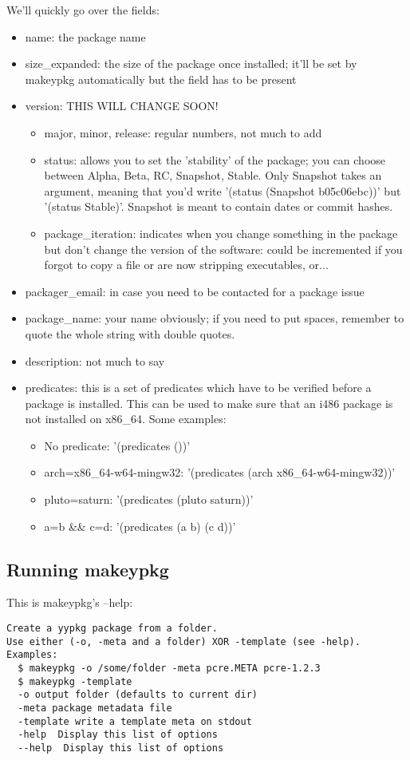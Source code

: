 \documentclass[a4paper]{article}
\begin{document}
We'll quickly go over the fields:
\begin{itemize}
  \item{name}: the package name
  \item{size\_expanded}: the size of the package once installed; it'll be set by makeypkg automatically but the field has to be present
  \item{version}: THIS WILL CHANGE SOON!
    \begin{itemize}
      \item{major, minor, release}: regular numbers, not much to add
      \item{status}: allows you to set the 'stability' of the package; you can choose between Alpha, Beta, RC, Snapshot, Stable. Only Snapshot takes an argument, meaning that you'd write '(status (Snapshot b05c06ebc))' but '(status Stable)'. Snapshot is meant to contain dates or commit hashes.
      \item{package\_iteration}: indicates when you change something in the package but don't change the version of the software: could be incremented if you forgot to copy a file or are now stripping executables, or...
    \end{itemize}
  \item{packager\_email}: in case you need to be contacted for a package issue
  \item{package\_name}: your name obviously; if you need to put spaces, remember to quote the whole string with double quotes.
  \item{description}: not much to say
  \item{predicates}: this is a set of predicates which have to be verified before a package is installed. This can be used to make sure that an i486 package is not installed on x86\_64. Some examples:
    \begin{itemize}
      \item{No predicate}: '(predicates ())'
      \item{arch=x86\_64-w64-mingw32}: '(predicates (arch x86\_64-w64-mingw32))'
      \item{pluto=saturn}: '(predicates (pluto saturn))'
      \item{a=b \&\& c=d}: '(predicates (a b) (c d))'
    \end{itemize}
\end{itemize}

\subsection{Running makeypkg}
This is makeypkg's --help:
\begin{verbatim}
Create a yypkg package from a folder.
Use either (-o, -meta and a folder) XOR -template (see -help). Examples:
  $ makeypkg -o /some/folder -meta pcre.META pcre-1.2.3
  $ makeypkg -template
  -o output folder (defaults to current dir)
  -meta package metadata file
  -template write a template meta on stdout
  -help  Display this list of options
  --help  Display this list of options
\end{verbatim}
\end{document}
